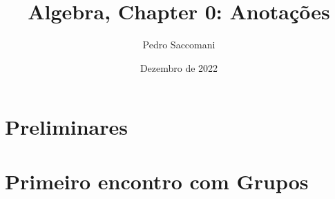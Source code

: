 \documentclass{article}
\title{Algebra, Chapter 0: Anotações}
\author{Pedro Saccomani}
\date{Dezembro de 2022}
\theoremstyle{plain}
\theoremstyle{definition}
\theoremstyle{remark}
\begin{document}
\newcommand{\cat}{\mathfrak{C}} \newcommand{\Hom }{\text{Hom}}
\newcommand{\Obj}{\text{Obj}}
\newcommand{\modset}[1]{\mathbb Z/ #1\mathbb Z}



\maketitle
\section{Preliminares}

\section{Primeiro encontro com Grupos}

\end{document}
